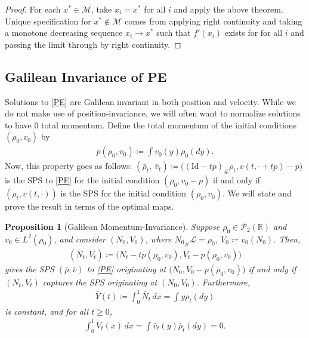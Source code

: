 \documentclass[10pt,a4paper]{amsart}
\newtheorem{prop}[thm]{Proposition}
\numberwithin{equation}{section}
\begin{document}
    \begin{proof}
        For each $x^*\in \mathcal{M}$, take $x_i=x^*$ for all $i$ and apply the above theorem. 
        Unique specification for $x^*\notin \mathcal{M}$ comes from applying right continuity and taking a monotone decreasing sequence $x_i\to x^*$ such that $f'(x_i)$ exists for for all $i$ and passing the limit through by right continuity. 
    \end{proof}

\subsection{Galilean Invariance of PE}
    Solutions to \eqref{PE} are Galilean invariant in both position and velocity. While we do not make use of position-invariance, we will often want to normalize solutions to have $0$ total momentum. Define the total momentum of the initial conditions $(\rho_0,v_0)$ by 
    \begin{align*}
        p(\rho_0,v_0)\coloneq\int v_0(y)\rho_0(dy). 
    \end{align*}
    Now, this property goes as follows: $(\bar{\rho}_t,\ \bar{v}_t)\coloneq\big((\text{Id}-tp)_\#\rho_t,v(t,\cdot+tp)-p\big)$ is the SPS to \eqref{PE} for the initial condition $(\rho_0,v_0-p)$ if and only if $(\rho_t,v(t,\cdot))$ is the SPS for the initial condition $(\rho_0,v_0)$. We will state and prove the result in terms of the optimal maps. 
    \begin{prop}[Galilean Momentum-Invariance]\label{Galilean-Invariance}
        Suppose $\rho_0\in\mathcal{P}_2(\mathbb{R})$ and $v_0\in L^2(\rho_0)$, and consider $(N_0,V_0)$, where ${N_0}_\#\mathcal{L}=\rho_0$, $V_0\coloneq v_0(N_0)$. Then, 
    \begin{align*}
        (\bar{N}_t,\bar{V}_t)\coloneq\big(N_t-tp(\rho_0,v_0),\bar{V}_t-p(\rho_0,v_0)\big)
    \end{align*}
    gives the SPS $(\bar{\rho},\bar{v})$ to \eqref{PE} originating at $\big(N_0,V_0-p(\rho_0,v_0)\big)$ if and only if $(N_t,V_t)$ captures the SPS originating at $(N_0,V_0)$. Furthermore, 
    \begin{align*}
        \bar{Y}(t)\coloneq\int_0^1 \bar{N}_t \, dx=\int y\rho_t(dy)
    \end{align*}
    is constant, and for all $t\geq0$,
    \begin{align}\label{0-totalMomentum}
        \int_0^1 \bar{V}_t(x) \, dx=\int \bar{v}_t(y) \bar{\rho}_t(dy)=0.
    \end{align}
    \end{prop}
\end{document}
